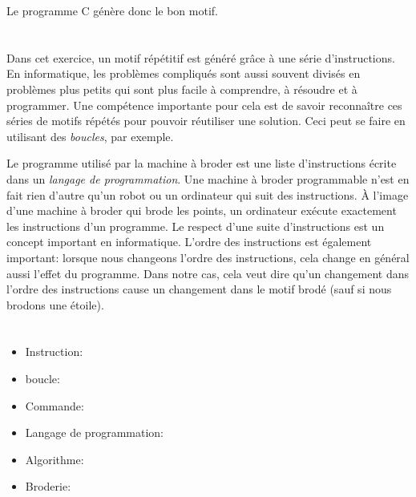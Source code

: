 {{Le programme C génère donc le bon motif.



\section*{\BrochureItsInformatics}
Dans cet exercice, un motif répétitif est généré grâce à une série d’instructions. En informatique, les problèmes compliqués sont aussi souvent divisés en problèmes plus petits qui sont plus facile à comprendre, à résoudre et à programmer. Une compétence importante pour cela est de savoir reconnaître ces séries de motifs répétés pour pouvoir réutiliser une solution. Ceci peut se faire en utilisant des \emph{boucles}, par exemple.

Le programme utilisé par la machine à broder est une liste d’instructions écrite dans un \emph{langage de programmation}. Une machine à broder programmable n’est en fait rien d’autre qu’un robot ou un ordinateur qui suit des instructions. À l’image d’une machine à broder qui brode les points, un ordinateur exécute exactement les instructions d’un programme. Le respect d’une suite d’instructions est un concept important en informatique. L’ordre des instructions est également important: lorsque nous changeons l’ordre des instructions, cela change en général aussi l’effet du programme. Dans notre cas, cela veut dire qu’un changement dans l’ordre des instructions cause un changement dans le motif brodé (sauf si nous brodons une étoile).



\section*{\BrochureWebsitesAndKeywords}
{\raggedright
\begin{itemize}
  \item Instruction: \href{https://fr.wikipedia.org/wiki/Instruction_informatique}{}
  \item boucle: \href{https://fr.wikipedia.org/wiki/Structure_de_contr\%C3\%B4le\#Boucles}{}
  \item Commande: \href{https://fr.wikipedia.org/wiki/Commande_informatique}{}
  \item Langage de programmation: \href{https://fr.wikipedia.org/wiki/Langage_de_programmation}{}
  \item Algorithme: \href{https://fr.wikipedia.org/wiki/Algorithme}{}
  \item Broderie: \href{https://fr.wikipedia.org/wiki/Broderie}{}
\end{itemize}


}}}
